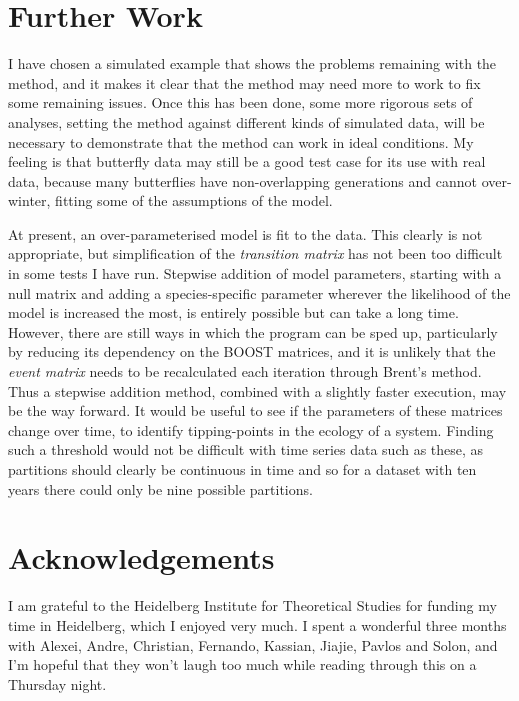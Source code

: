 \documentclass[12pt]{amsart}
\begin{document}
\section{Further Work}
I have chosen a simulated example that shows the problems remaining with the method, and it makes it clear that the method may need more to work to fix some remaining issues. Once this has been done, some more rigorous sets of analyses, setting the method against different kinds of simulated data, will be necessary to demonstrate that the method can work in ideal conditions. My feeling is that butterfly data may still be a good test case for its use with real data, because many butterflies have non-overlapping generations and cannot over-winter, fitting some of the assumptions of the model.

At present, an over-parameterised model is fit to the data. This clearly is not appropriate, but simplification of the \emph{transition matrix} has not been too difficult in some tests I have run. Stepwise addition of model parameters, starting with a null matrix and adding a species-specific parameter wherever the likelihood of the model is increased the most, is entirely possible but can take a long time. However, there are still ways in which the program can be sped up, particularly by reducing its dependency on the BOOST matrices, and it is unlikely that the \emph{event matrix} needs to be recalculated each iteration through Brent's method. Thus a stepwise addition method, combined with a slightly faster execution, may be the way forward. It would be useful to see if the parameters of these matrices change over time, to identify tipping-points in the ecology of a system. Finding such a threshold would not be difficult with time series data such as these, as partitions should clearly be continuous in time and so for a dataset with ten years there could only be nine possible partitions.
\section{Acknowledgements}
I am grateful to the Heidelberg Institute for Theoretical Studies for funding my time in Heidelberg, which I enjoyed very much. I spent a wonderful three months with Alexei, Andre, Christian, Fernando, Kassian, Jiajie, Pavlos and Solon, and I'm hopeful that they won't laugh too much while reading through this on a Thursday night.


\end{document}
